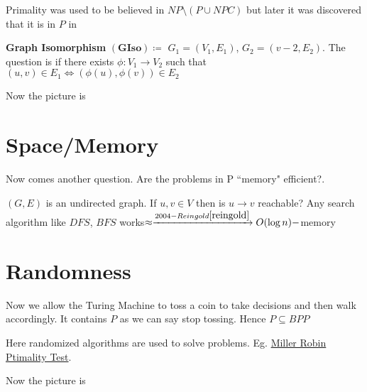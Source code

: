 \documentclass{article}
\begin{document}
Primality was used to be believed in $N P \setminus (P \cup N P C)$ but later it was discovered that it is in $P$ in \cite{aks}\parinf

\textbf{Graph Isomorphism} $(\boldsymbol{GIso})\coloneqq$ $G_1=(V_1,E_1)$, $G_2=(v-2,E_2)$. The question is if there exists $\phi:V_1\to V_2$ such that $(u,v)\in E_1\iff (\phi(u),\phi(v))\in E_2$\parinn

Now the picture is 
\begin{center}
\end{center}
\section{Space/Memory}
Now comes another question. Are the problems in P ``memory" efficient?.

$(G, E)$ is an undirected graph. If $u, v \in V$ then is $u \to v$ reachable? Any search algorithm like $DF S$, $BF S$ works$\approx\xrightarrow{2004-Reingold \cite{reingold}}O(\log n)-$memory

\section{Randomness}
Now we allow the Turing Machine to toss a coin to take decisions and then walk accordingly. It contains $P$ as
we can say stop tossing. Hence $P \subseteq BP P$

Here randomized algorithms are used to solve problems. Eg. \href{https://en.wikipedia.org/wiki/Miller–Rabin_primality_test}{Miller Robin Ptimality Test}.

Now the picture is 
\begin{center}
\end{center}
\end{document}
